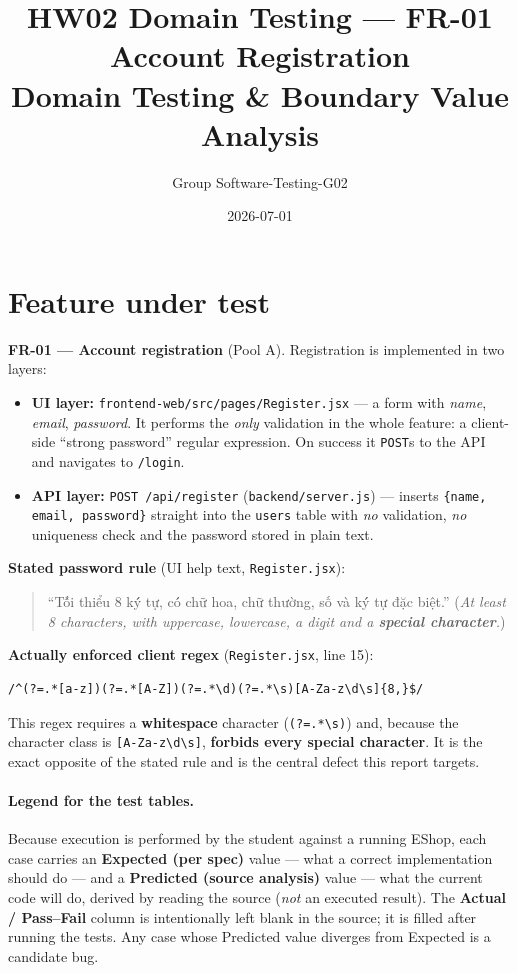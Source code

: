 \documentclass[11pt,a4paper]{article}
\title{HW02 Domain Testing --- FR-01 Account Registration\\[2pt]
\large Domain Testing \& Boundary Value Analysis}
\author{Group Software-Testing-G02}
\date{2026-07-01}
\begin{document}
\maketitle

\section*{Feature under test}
\textbf{FR-01 --- Account registration} (Pool A). Registration is implemented in two
layers:
\begin{itemize}[leftmargin=*]
  \item \textbf{UI layer:} \texttt{frontend-web/src/pages/Register.jsx} --- a form with
  \emph{name}, \emph{email}, \emph{password}. It performs the \emph{only} validation in the
  whole feature: a client-side ``strong password'' regular expression. On success it
  \texttt{POST}s to the API and navigates to \texttt{/login}.
  \item \textbf{API layer:} \texttt{POST /api/register} (\texttt{backend/server.js}) ---
  inserts \verb|{name, email, password}| straight into the \texttt{users} table with
  \emph{no} validation, \emph{no} uniqueness check and the password stored in plain text.
\end{itemize}

\noindent\textbf{Stated password rule} (UI help text, \texttt{Register.jsx}):
\begin{quote}
``T\'ối thiểu 8 k\'ý tự, c\'ó chữ hoa, chữ thường, số v\`a k\'ý tự đặc biệt.''
(\emph{At least 8 characters, with uppercase, lowercase, a digit and a \textbf{special
character}.})
\end{quote}

\noindent\textbf{Actually enforced client regex} (\texttt{Register.jsx}, line 15):
\begin{verbatim}
/^(?=.*[a-z])(?=.*[A-Z])(?=.*\d)(?=.*\s)[A-Za-z\d\s]{8,}$/
\end{verbatim}
This regex requires a \textbf{whitespace} character (\verb|(?=.*\s)|) and, because the
character class is \verb|[A-Za-z\d\s]|, \textbf{forbids every special character}. It is the
exact opposite of the stated rule and is the central defect this report targets.

\paragraph{Legend for the test tables.}
Because execution is performed by the student against a running EShop, each case carries an
\textbf{Expected (per spec)} value --- what a correct implementation should do --- and a
\textbf{Predicted (source analysis)} value --- what the current code will do, derived by
reading the source (\emph{not} an executed result). The \textbf{Actual / Pass--Fail} column
is intentionally left blank in the source; it is filled after running the tests. Any case
whose Predicted value diverges from Expected is a candidate bug.
\end{document}

